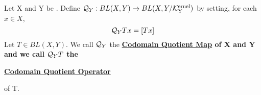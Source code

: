 \label{def:handedquotientoperators}
\newcommand{\CodomainQuotientOperator}[0]{
    \bf \hyperref[def:handedquotientoperators]{Codomain Quotient Operator} \rm
}
\newcommand{\CodomainQuotientMap}[0]{
    \bf \hyperref[def:handedquotientoperators]{Codomain Quotient Map} \rm
}
\begin{df}
    Let X and Y be \SeminormedSpaces.
    Define $\mathcal{Q}_Y:BL(X,Y) \to BL(X, Y/\bf\mathcal{K}\rm^{ernel}_Y)$ by setting, 
    for each $x \in X$, 
    \begin{equation*} 
        \mathcal{Q}_YTx = [Tx]
    \end{equation*}
    Let $T \in BL(X,Y)$. 
    We call $\mathcal{Q}_Y$ the \CodomainQuotientMap of X and Y
    and we call $\mathcal{Q}_YT$ the 
    \CodomainQuotientOperator
    of T.
\end{df}

